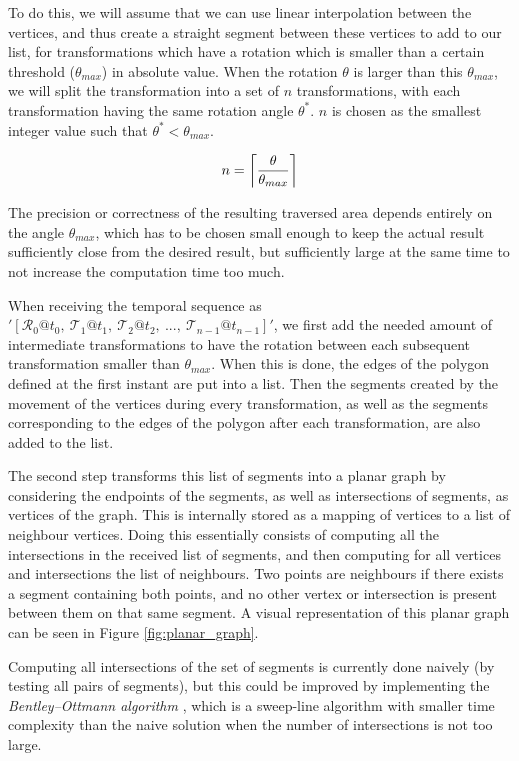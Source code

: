 To do this, we will assume that we can use linear interpolation between the vertices, and thus create a straight segment between these vertices to add to our list, for transformations which have a rotation which is smaller than a certain threshold ($\theta_{max}$) in absolute value. When the rotation $\theta$ is larger than this $\theta_{max}$, we will split the transformation into a set of $n$ transformations, with each transformation having the same rotation angle $\theta^*$. $n$ is chosen as the smallest integer value such that $\theta^* < \theta_{max}$.

\[
    n = \ceil*{\frac{\theta}{\theta_{max}}}
\]

The precision or correctness of the resulting traversed area depends entirely on the angle $\theta_{max}$, which has to be chosen small enough to keep the actual result sufficiently close from the desired result, but sufficiently large at the same time to not increase the computation time too much.

When receiving the temporal sequence as $'[\mathcal{R}_0@t_0,\ \mathcal{T}_1@t_1,\ \mathcal{T}_2@t_2,\ ...,\ \mathcal{T}_{n-1}@t_{n-1}]'$, we first add the needed amount of intermediate transformations to have the rotation between each subsequent transformation smaller than $\theta_{max}$. When this is done, the edges of the polygon defined at the first instant are put into a list. Then the segments created by the movement of the vertices during every transformation, as well as the segments corresponding to the edges of the polygon after each transformation, are also added to the list.

The second step transforms this list of segments into a planar graph by considering the endpoints of the segments, as well as intersections of segments, as vertices of the graph. This is internally stored as a mapping of vertices to a list of neighbour vertices. Doing this essentially consists of computing all the intersections in the received list of segments, and then computing for all vertices and intersections the list of neighbours. Two points are neighbours if there exists a segment containing both points, and no other vertex or intersection is present between them on that same segment. A visual representation of this planar graph can be seen in Figure \ref{fig:planar_graph}.

Computing all intersections of the set of segments is currently done naively (by testing all pairs of segments), but this could be improved by implementing the \textit{Bentley–Ottmann algorithm} \cite{computational_geometry}, which is a sweep-line algorithm with smaller time complexity than the naive solution when the number of intersections is not too large.

